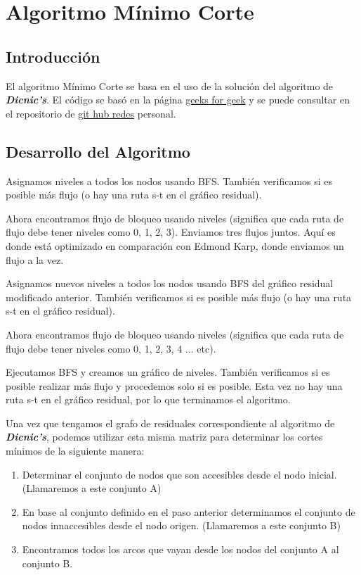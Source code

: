 \documentclass{report}
\newcommand{\dic}{{\bfseries {\textit{Dicnic's}}}}
\begin{document}
\tableofcontents
\chapter{Algoritmo Mínimo Corte}

\section{Introducción}
El algoritmo Mínimo Corte se basa en el uso de la solución del algoritmo de \dic . El código se basó en la página \href{https://www.geeksforgeeks.org/dinics-algorithm-maximum-flow/}{geeks for geek} y se puede consultar en el repositorio de \href{https://github.com/arnoldae9/redes.git}{git hub redes} personal.

\section{Desarrollo del Algoritmo}
Asignamos niveles a todos los nodos usando BFS. También verificamos si es posible más flujo (o hay una ruta s-t en el gráfico residual). 

Ahora encontramos flujo de bloqueo usando niveles (significa que cada ruta de flujo debe tener niveles como 0, 1, 2, 3). Enviamos tres flujos juntos. Aquí es donde está optimizado en comparación con Edmond Karp, donde enviamos un flujo a la vez.

Asignamos nuevos niveles a todos los nodos usando BFS del gráfico residual modificado anterior. También verificamos si es posible más flujo (o hay una ruta s-t en el gráfico residual). 

Ahora encontramos flujo de bloqueo usando niveles (significa que cada ruta de flujo debe tener niveles como 0, 1, 2, 3, 4 ...  etc).

Ejecutamos BFS y creamos un gráfico de niveles. También verificamos si es posible realizar más flujo y procedemos solo si es posible. Esta vez no hay una ruta s-t en el gráfico residual, por lo que terminamos el algoritmo.

Una vez que tengamos el grafo de residuales correspondiente al algoritmo de \dic, podemos utilizar esta misma matriz para determinar los cortes mínimos de la siguiente manera:

\begin{enumerate}
    \item Determinar el conjunto de nodos que son accesibles desde el nodo inicial. (Llamaremos a este conjunto A)
    \item En base al conjunto definido en el paso anterior determinamos el conjunto de nodos innaccesibles desde el nodo origen. (Llamaremos a este conjunto B)
    \item Encontramos todos los arcos que vayan desde los nodos del conjunto A al conjunto B.
\end{enumerate}
\end{document}
